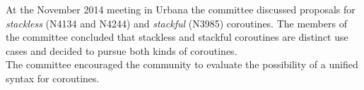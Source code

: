 At the November 2014 meeting in Urbana the committee discussed proposals for
\emph{stackless} (N4134\cite{N4134} and N4244\cite{N4244}) and \emph{stackful}
(N3985\cite{N3985}) coroutines. The members of the committee concluded that
stackless and stackful coroutines are distinct use cases and decided to pursue
both kinds of coroutines.\\
The committee encouraged the community to evaluate the possibility of a unified
syntax for coroutines.
